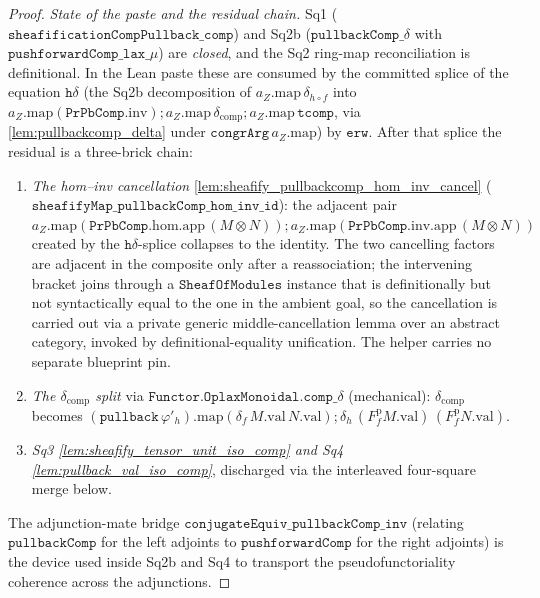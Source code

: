 \begin{proof}
  \emph{State of the paste and the residual chain.} Sq1 (\(\mathtt{sheafificationCompPullback\_comp}\))
  and Sq2b (\(\mathtt{pullbackComp\_}\delta\) with \(\mathtt{pushforwardComp\_lax\_}\mu\)) are
  \emph{closed}, and the Sq2 ring-map reconciliation is definitional. In the Lean paste these are
  consumed by the committed splice of the equation \(\mathtt{h}\delta\) (the Sq2b decomposition of
  \(a_Z.\mathrm{map}\,\delta_{h\circ f}\) into
  \(a_Z.\mathrm{map}(\mathtt{PrPbComp}.\mathrm{inv}) \mathbin{;} a_Z.\mathrm{map}\,\delta_{\mathrm{comp}}
  \mathbin{;} a_Z.\mathrm{map}\,\mathtt{tcomp}\), via \cref{lem:pullbackcomp_delta} under
  \(\mathtt{congrArg}\,a_Z.\mathrm{map}\)) by \(\mathtt{erw}\). After that splice the residual is a
  three-brick chain:
  \begin{enumerate}
    \item[(i)] \emph{The hom--inv cancellation} \cref{lem:sheafify_pullbackcomp_hom_inv_cancel}
      (\(\mathtt{sheafifyMap\_pullbackComp\_hom\_inv\_id}\)): the adjacent pair
      \(a_Z.\mathrm{map}(\mathtt{PrPbComp}.\mathrm{hom}.\mathrm{app}\,(M\otimes N)) \mathbin{;}
      a_Z.\mathrm{map}(\mathtt{PrPbComp}.\mathrm{inv}.\mathrm{app}\,(M\otimes N))\) created by the
      \(\mathtt{h}\delta\)-splice collapses to the identity. The two cancelling
      factors are adjacent in the composite only after a reassociation; the intervening bracket
      joins through a \(\mathtt{SheafOfModules}\) instance that is definitionally but not
      syntactically equal to the one in the ambient goal, so the cancellation is carried out via
      a private generic middle-cancellation lemma over an abstract category, invoked by
      definitional-equality unification. The helper carries no separate blueprint pin.
    \item[(ii)] \emph{The \(\delta_{\mathrm{comp}}\) split} via
      \(\mathtt{Functor.OplaxMonoidal.comp\_}\delta\) (mechanical): \(\delta_{\mathrm{comp}}\)
      becomes \((\mathtt{pullback}\,\varphi'_h).\mathrm{map}(\delta_f\,M.\mathrm{val}\,N.\mathrm{val})
      \mathbin{;} \delta_h\,(F^{\mathrm p}_f M.\mathrm{val})\,(F^{\mathrm p}_f N.\mathrm{val})\).
    \item[(iii)] \emph{Sq3 \cref{lem:sheafify_tensor_unit_iso_comp} and Sq4
      \cref{lem:pullback_val_iso_comp}}, discharged via the interleaved four-square merge below.
  \end{enumerate}
  The adjunction-mate bridge \(\mathtt{conjugateEquiv\_pullbackComp\_inv}\) (relating
  \(\mathtt{pullbackComp}\) for the left adjoints to \(\mathtt{pushforwardComp}\) for the
  right adjoints) is the device used inside Sq2b and Sq4 to transport the pseudofunctoriality
  coherence across the adjunctions.


\end{proof}
